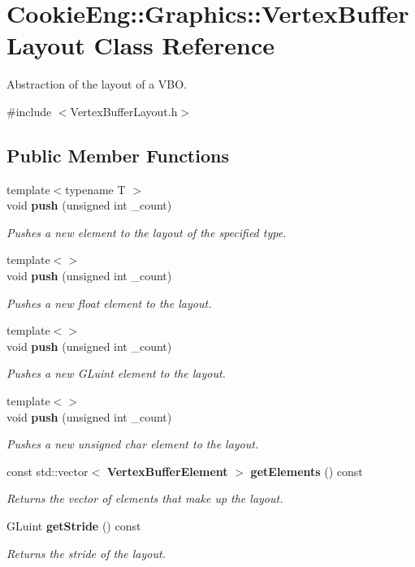 \section{Cookie\+Eng\+:\+:Graphics\+:\+:Vertex\+Buffer\+Layout Class Reference}
\label{class_cookie_eng_1_1_graphics_1_1_vertex_buffer_layout}


Abstraction of the layout of a V\+BO.  




{\ttfamily \#include $<$Vertex\+Buffer\+Layout.\+h$>$}

\subsection*{Public Member Functions}
\begin{DoxyCompactItemize}
\item 
{\footnotesize template$<$typename T $>$ }\\void \textbf{ push} (unsigned int \+\_\+count)
\begin{DoxyCompactList}\small\item\em Pushes a new element to the layout of the specified type. \end{DoxyCompactList}\item 
{\footnotesize template$<$$>$ }\\void \textbf{ push} (unsigned int \+\_\+count)
\begin{DoxyCompactList}\small\item\em Pushes a new float element to the layout. \end{DoxyCompactList}\item 
{\footnotesize template$<$$>$ }\\void \textbf{ push} (unsigned int \+\_\+count)
\begin{DoxyCompactList}\small\item\em Pushes a new G\+Luint element to the layout. \end{DoxyCompactList}\item 
{\footnotesize template$<$$>$ }\\void \textbf{ push} (unsigned int \+\_\+count)
\begin{DoxyCompactList}\small\item\em Pushes a new unsigned char element to the layout. \end{DoxyCompactList}\item 
const std\+::vector$<$ \textbf{ Vertex\+Buffer\+Element} $>$ \textbf{ get\+Elements} () const
\begin{DoxyCompactList}\small\item\em Returns the vector of elements that make up the layout. \end{DoxyCompactList}\item 
G\+Luint \textbf{ get\+Stride} () const
\begin{DoxyCompactList}\small\item\em Returns the stride of the layout. \end{DoxyCompactList}\end{DoxyCompactItemize}
